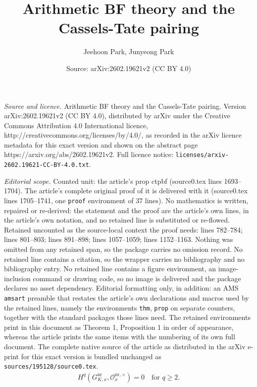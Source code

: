 \documentclass[10pt,a4paper]{amsart}
\title{Arithmetic BF theory and the Cassels-Tate pairing}
\author{Jeehoon Park, Junyeong Park}
\date{Source: arXiv:2602.19621v2 (CC BY 4.0)}
\begin{document}
\maketitle

\noindent\emph{Source and licence.} Arithmetic BF theory and the Cassels-Tate pairing. Version arXiv:2602.19621v2 (CC BY 4.0), distributed by arXiv under the Creative Commons Attribution 4.0 International licence, http://creativecommons.org/licenses/by/4.0/, as recorded in the arXiv licence metadata for this exact version and shown on the abstract page https://arxiv.org/abs/2602.19621v2. Full licence notice: \texttt{licenses/arxiv-2602.19621-CC-BY-4.0.txt}.\par\smallskip

\noindent\textit{Editorial scope.} Counted unit: the article's prop ctpbf (source0.tex lines 1693--1704). The article's complete original proof of it is delivered with it (source0.tex lines 1705--1741, one \texttt{proof} environment of 37 lines). No mathematics is written, repaired or re-derived: the statement and the proof are the article's own lines, in the article's own notation, and no retained line is substituted or re-flowed.  Retained uncounted as the source-local context the proof needs: lines 782--784; lines 801--803; lines 891--898; lines 1057--1059; lines 1152--1163.  Nothing was omitted from any retained span, so the package carries no omission record.  No retained line contains a citation, so the wrapper carries no bibliography and no bibliography entry.  No retained line contains a figure environment, an image-inclusion command or drawing code, so no image is delivered and the package declares no asset dependency.  Editorial formatting only, in addition: an AMS \texttt{amsart} preamble that restates the article's own declarations and macros used by the retained lines, namely the environments \texttt{thm}, \texttt{prop} on separate counters, together with the standard packages those lines need.  The retained environments print in this document as Theorem 1, Proposition 1 in order of appearance, whereas the article prints the same items with the numbering of its own full document.  The complete native source of the article as distributed in the arXiv e-print for this exact version is bundled unchanged as \texttt{sources/195128/source0.tex}.
\begin{align}\label{local-HGnr-vanishing}
    H^q(G_{K,x}^\mathrm{nr},\mathcal{O}_x^{\mathrm{nr},\times})=0\quad\textrm{for $q\geq2$.}
\end{align}
\end{document}
